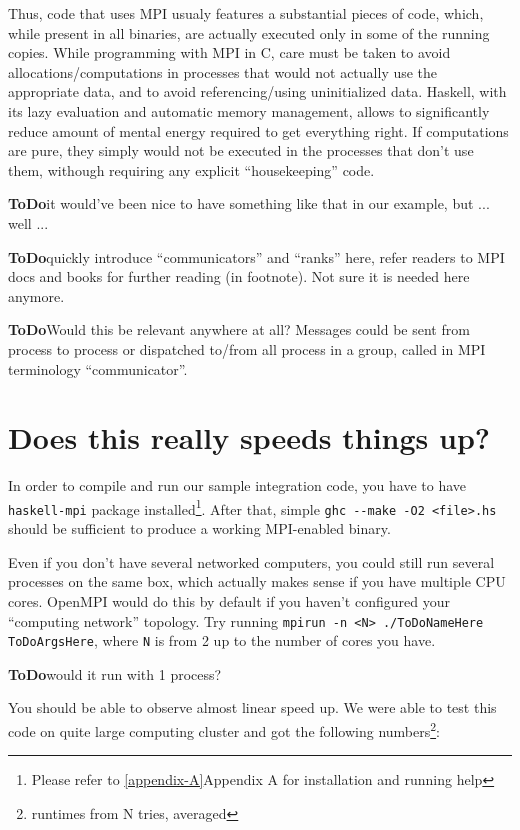 \documentclass{tmr}
\newcommand{\ToDo}[1]{\textbf{ToDo}{#1}}
\begin{document}
Thus, code that uses MPI usualy features a substantial pieces of code,
which, while present in all binaries, are actually executed only in
some of the running copies. While programming with MPI in C, care must
be taken to avoid allocations/computations in processes that would not
actually use the appropriate data, and to avoid referencing/using
uninitialized data. Haskell, with its lazy evaluation and automatic
memory management, allows to significantly reduce amount of mental
energy required to get everything right. If computations are pure,
they simply would not be executed in the processes that don't use
them, withough requiring any explicit ``housekeeping'' code.

\ToDo it would've been nice to have something like that in our
example, but ... well ...

\ToDo quickly introduce ``communicators'' and ``ranks'' here, refer
readers to MPI docs and books for further reading (in footnote). Not
sure it is needed here anymore.

\ToDo Would this be relevant anywhere at all? Messages could be sent from process to process or
dispatched to/from all process in a group, called in MPI terminology ``communicator''.


\section{Does this really speeds things up?}

In order to compile and run our sample integration code, you have to
have \verb|haskell-mpi| package installed\footnote{Please refer to
  \ref{appendix-A}{Appendix A} for installation and running help}. After that,
simple \verb|ghc --make -O2 <file>.hs| should be sufficient to produce
a working MPI-enabled binary.

Even if you don't have several networked computers, you could still
run several processes on the same box, which actually makes sense if
you have multiple CPU cores. OpenMPI would do this by default if you
haven't configured your ``computing network'' topology. Try running
\verb|mpirun -n <N> ./ToDoNameHere ToDoArgsHere|, where \verb|N| is
from 2 up to the number of cores you have.

\ToDo would it run with 1 process?

You should be able to observe almost linear speed up. We were able to
test this code on quite large computing cluster and got the following
numbers\footnote{runtimes from N tries, averaged}:
\end{document}

